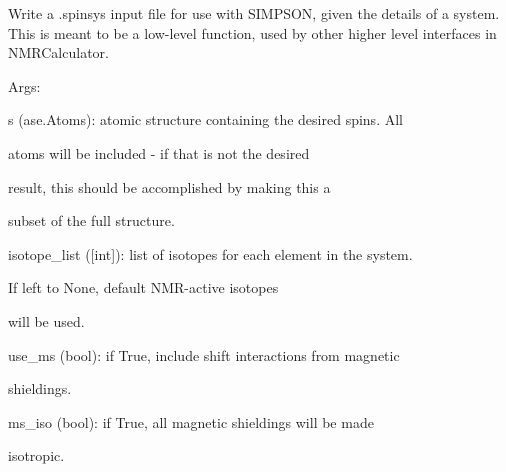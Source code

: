\documentclass[letterpaper,10pt,english]{sphinxmanual}
\begin{document}
\begin{fulllineitems}
\label{doctree/soprano.calculate.nmr.simpson:soprano.calculate.nmr.simpson.write_spinsys}
Write a .spinsys input file for use with SIMPSON, given the details of a
system. This is meant to be a low-level function, used by other higher
level interfaces in NMRCalculator.

\begin{DUlineblock}{0em}
\item[] Args:
\item[]
\begin{DUlineblock}{\DUlineblockindent}
\item[] s (ase.Atoms): atomic structure containing the desired spins. All
\item[]
\begin{DUlineblock}{\DUlineblockindent}
\item[] atoms will be included - if that is not the desired
\item[] result, this should be accomplished by making this a
\item[] subset of the full structure.
\end{DUlineblock}
\item[] isotope\_list ({[}int{]}): list of isotopes for each element in the system.
\item[]
\begin{DUlineblock}{\DUlineblockindent}
\item[] If left to None, default NMR-active isotopes
\item[] will be used.
\end{DUlineblock}
\item[] use\_ms (bool): if True, include shift interactions from magnetic
\item[]
\begin{DUlineblock}{\DUlineblockindent}
\item[] shieldings.
\end{DUlineblock}
\item[] ms\_iso (bool): if True, all magnetic shieldings will be made
\item[]
\begin{DUlineblock}{\DUlineblockindent}
\item[] isotropic.
\end{DUlineblock}

\end{DUlineblock}
\end{DUlineblock}
\end{fulllineitems}
\end{document}
